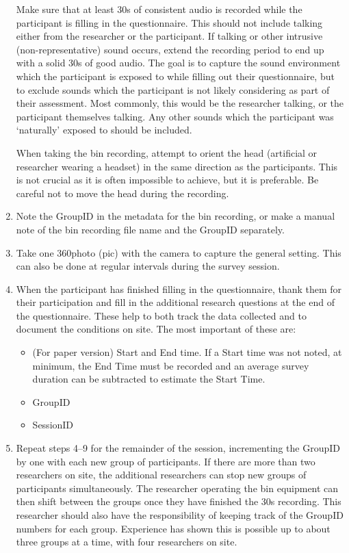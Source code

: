 \begin{enumerate}
           Make sure that at least 30s of consistent audio is recorded while the participant is filling in the questionnaire. This should not include talking either from the researcher or the participant. If talking or other intrusive (non-representative) sound occurs, extend the recording period to end up with a solid 30s of good audio. The goal is to capture the sound environment which the participant is exposed to while filling out their questionnaire, but to exclude sounds which the participant is not likely considering as part of their assessment. Most commonly, this would be the researcher talking, or the participant themselves talking. Any other sounds which the participant was `naturally' exposed to should be included.

           When taking the \gls{bin} recording, attempt to orient the head (artificial or researcher wearing a headset) in the same direction as the participants. This is not crucial as it is often impossible to achieve, but it is preferable. Be careful not to move the head during the recording.
     \item Note the GroupID in the metadata for the \gls{bin} recording, or make a manual note of the \gls{bin} recording file name and the GroupID separately.
     \item Take one 360\degree photo (\gls{pic}) with the camera to capture the general setting. This can also be done at regular intervals during the survey session.
     \item When the participant has finished filling in the questionnaire, thank them for their participation and fill in the additional research questions at the end of the questionnaire. These help to both track the data collected and to document the conditions on site. The most important of these are:
           \begin{itemize}
             \item (For paper version) Start and End time. If a Start time was not noted, at minimum, the End Time must be recorded and an average survey duration can be subtracted to estimate the Start Time.
             \item GroupID
             \item SessionID
           \end{itemize}
     \item Repeat steps 4--9 for the remainder of the session, incrementing the GroupID by one with each new group of participants. If there are more than two researchers on site, the additional researchers can stop new groups of participants simultaneously. The researcher operating the \gls{bin} equipment can then shift between the groups once they have finished the 30s recording. This researcher should also have the responsibility of keeping track of the GroupID numbers for each group. Experience has shown this is possible up to about three groups at a time, with four researchers on site.

\end{enumerate}
